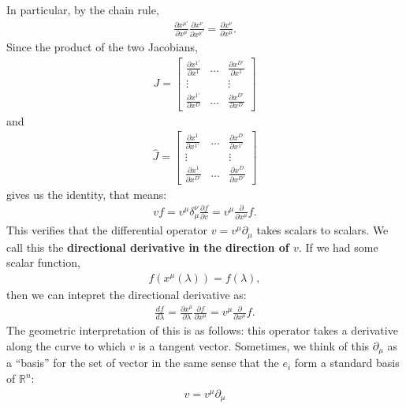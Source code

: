 \documentclass[11pt]{article}
\newcommand{\R}[0]{\mathbb{R}}
\theoremstyle{definition}
\begin{document}
In particular, by the chain rule, 
\begin{align*}
	\frac{\partial x^{\mu'}}{\partial x^\mu} \frac{\partial x^\nu}{\partial x^{\mu'}} = \frac{\partial x^\nu}{\partial x^\mu}. 
\end{align*}
Since the product of the two Jacobians, 
\begin{align*}
	J = \begin{bmatrix}
		\frac{\partial x^{1'}}{\partial x^1} & \hdots & \frac{\partial x^{D'}}{\partial x^1} \\
		\vdots  & & \vdots \\
		\frac{\partial x^{1'}}{\partial x^D} & \hdots & \frac{\partial x^{D'}}{\partial x^D}
	\end{bmatrix}
\end{align*}
and 
\begin{align*}
	\hat{J} = \begin{bmatrix}
		\frac{\partial x^{1}}{\partial x^{1'}} & \hdots & \frac{\partial x^{D}}{\partial x^{1'}} \\
		\vdots  & & \vdots \\
		\frac{\partial x^{1}}{\partial x^{D'}} & \hdots & \frac{\partial x^{D}}{\partial x^{D'}}
	\end{bmatrix}
\end{align*}
gives us the identity, that means: 
\begin{align*}
	vf = v^\mu \delta_\mu^\nu \frac{\partial f }{\partial v} = v^\mu \frac{\partial}{\partial x^\mu} f.
\end{align*}
This verifies that the differential operator \( v = v^\mu \partial_\mu \) takes scalars to scalars. We call this the \textbf{directional derivative in the direction of \( v \)}. If we had some scalar function, 
\begin{align*}
	f(x^\mu(\lambda)) = f(\lambda), 
\end{align*}
then we can intepret the directional derivative as: 
\begin{align*}
	\frac{df}{d \lambda} = \frac{\partial x^\mu}{\partial \lambda} \frac{\partial f}{\partial x^\mu} = v^\mu \frac{\partial}{\partial x^\mu}f.
\end{align*}
The geometric interpretation of this is as follows: this operator takes a derivative along the curve to which \( v \) is a tangent vector. Sometimes, we think of this \( \partial_\mu \) as a ``basis'' for the set of vector in the same sense that the \( e_i \) form a standard basis of \( \R^n \): 
\begin{align*}
	v = v^\mu \partial_\mu
\end{align*}
\end{document}
